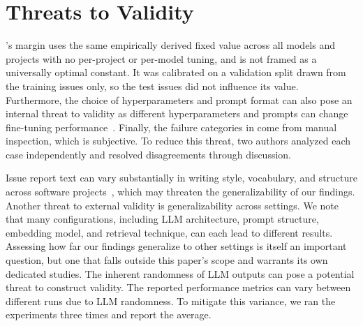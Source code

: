 
\section{Threats to Validity}
\label{sec:threats}

\bragtag's margin uses the same empirically derived fixed value across all models and projects with no per-project or per-model tuning, and is not framed as a universally optimal constant. It was calibrated on a validation split drawn from the training issues only, so the test issues did not influence its value. Furthermore, the choice of hyperparameters and prompt format can also pose an internal threat to validity as different hyperparameters and prompts can change fine-tuning performance~\cite{heo2025study,aracena2025applying}. Finally, the failure categories in  come from manual inspection, which is subjective. To reduce this threat, two authors analyzed each case independently and resolved disagreements through discussion.



Issue report text can vary substantially in writing style, vocabulary, and structure across software projects~\cite{akhavan2026linkanchorautonomousllmbasedagent}, which may threaten the generalizability of our findings.
Another threat to external validity is generalizability across settings. We note that many configurations, including LLM architecture, prompt structure, embedding model, and retrieval technique, can each lead to different results. Assessing how far our findings generalize to other settings is itself an important question, but one that falls outside this paper's scope and warrants its own dedicated studies.
The inherent randomness of LLM outputs can pose a potential threat to construct validity. The reported performance metrics can vary between different runs due to LLM randomness. To mitigate this variance, we ran the experiments three times and report the average. 

